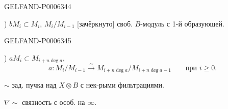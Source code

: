 \begin{GelfandAdjacentEvidence}{GELFAND-P000634}{4}


) \(bM_i\subset M_i\), \(M_i/M_{i-1}\) [зачёркнуто]
своб. \(B\)-модуль с 1-й образующей.
\end{GelfandAdjacentEvidence}
\begin{GelfandAdjacentEvidence}{GELFAND-P000634}{5}


) \(aM_i\subset M_{i+n\operatorname{deg}a}\),
\[
a:M_i/M_{i-1}\overset{\sim}{\to}
M_{i+n\operatorname{deg}a}/M_{i+n\operatorname{deg}a-1}
\qquad\text{при }i\geqslant0.
\]
\end{GelfandAdjacentEvidence}


\(\sim\) зад. пучка над \(X\otimes B\) с нек-рыми фильтрациями.

\(\nabla\sim\) связность с особ. на \(\infty\).
\begin{center}\textemdash\,\textperiodcentered\,\textemdash\end{center}



